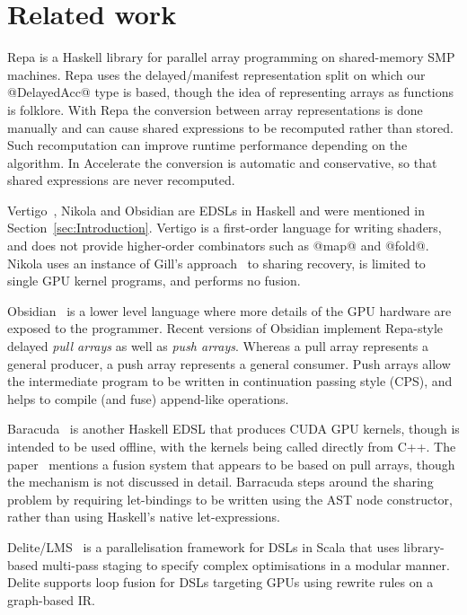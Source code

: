 \section{Related work} %
\label{sec:related}
Repa \cite{Keller:Repa} is a Haskell library for parallel array programming on shared-memory SMP machines. Repa uses the \mbox{delayed/manifest} representation split on which our @DelayedAcc@ type is based, though the idea of representing arrays as functions is folklore. With Repa the conversion between array representations is done manually and can cause shared expressions to be recomputed rather than stored. Such recomputation can improve runtime performance depending on the algorithm. In Accelerate the conversion is automatic and conservative, so that shared expressions are never recomputed. 

Vertigo~\cite{Elliott:Vertigo}, Nikola \cite{Mainland:nikola} and Obsidian \cite{Claessen:obsidian} are EDSLs in Haskell and were mentioned in Section~\ref{sec:Introduction}. Vertigo is a first-order language for writing shaders, and does not provide higher-order combinators such as @map@ and @fold@. Nikola uses an instance of Gill's approach~\cite{Gill:2009dx} to sharing recovery, is limited to single GPU kernel programs, and performs no fusion. 

Obsidian~\cite{Claessen:obsidian} is a lower level language where more details of the GPU hardware are exposed to the programmer. Recent versions of Obsidian \cite{Claessen:obsidian-expressive} implement Repa-style delayed \emph{pull arrays} as well as \emph{push arrays}. Whereas a pull array represents a general producer, a push array represents a general consumer. Push arrays allow the intermediate program to be written in continuation passing style (CPS), and helps to compile (and fuse) append-like operations.

Baracuda~\cite{Larsen:baracuda} is another Haskell EDSL that produces CUDA GPU kernels, though is intended to be used offline, with the kernels being called directly from C++. The paper~\cite{Larsen:baracuda} mentions a fusion system that appears to be based on pull arrays, though the mechanism is not discussed in detail. Barracuda steps around the sharing problem by requiring let-bindings to be written using the AST node constructor, rather than using Haskell's native let-expressions.

Delite/LMS~\cite{Rompf-etal:Delite} is a parallelisation framework for DSLs in Scala that uses library-based multi-pass staging to specify complex optimisations in a modular manner. Delite supports loop fusion for DSLs targeting GPUs using rewrite rules on a graph-based IR.

